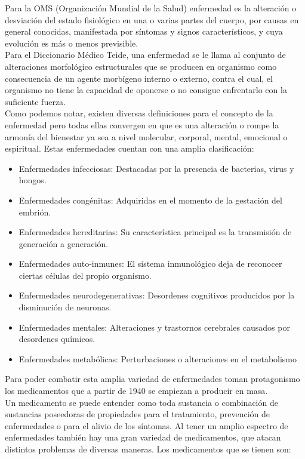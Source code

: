 Para la OMS (Organización Mundial de la Salud) enfermedad es la alteración o desviación del estado fisiológico en una o varias partes del cuerpo, por causas en general conocidas, manifestada por síntomas y signos característicos, y cuya evolución es más o menos previsible.\\
Para el Diccionario Médico Teide, una enfermedad se le llama al conjunto de alteraciones morfológico estructurales que se producen en organismo como consecuencia de un agente morbígeno interno o externo, contra el cual, el organismo no tiene la capacidad de oponerse o no consigue enfrentarlo con la suficiente fuerza.\\
Como podemos notar, existen diversas definiciones para el concepto de la enfermedad pero todas ellas convergen en que es una alteración o rompe la armonía del bienestar ya sea a nivel molecular, corporal, mental, emocional o espiritual.
Estas enfermedades cuentan con una amplia clasificación:
\begin{itemize}
	\item Enfermedades infecciosas: Destacadas por la presencia de bacterias, virus y hongos.
	\item Enfermedades congénitas: Adquiridas en el momento de la gestación del embrión.
	\item Enfermedades hereditarias: Su característica principal es la transmisión de generación a generación.
	\item Enfermedades auto-inmunes: El sistema inmunológico deja de reconocer ciertas células del propio organismo.
	\item Enfermedades neurodegenerativas: Desordenes cognitivos producidos por la disminución de neuronas.
	\item Enfermedades mentales: Alteraciones y trastornos cerebrales causados por desordenes químicos.
	\item Enfermedades metabólicas: Perturbaciones o alteraciones en el metabolismo
\end{itemize} 
Para poder combatir esta amplia variedad de enfermedades toman protagonismo los medicamentos que a partir de 1940 se empiezan a producir en masa.\\
Un medicamento se puede entender como toda sustancia o combinación de sustancias poseedoras de propiedades para el tratamiento, prevención de enfermedades o para el alivio de los síntomas.
Al tener un amplio espectro de enfermedades también hay una gran variedad de medicamentos, que atacan distintos problemas de diversas maneras.
Los medicamentos que se tienen son:
